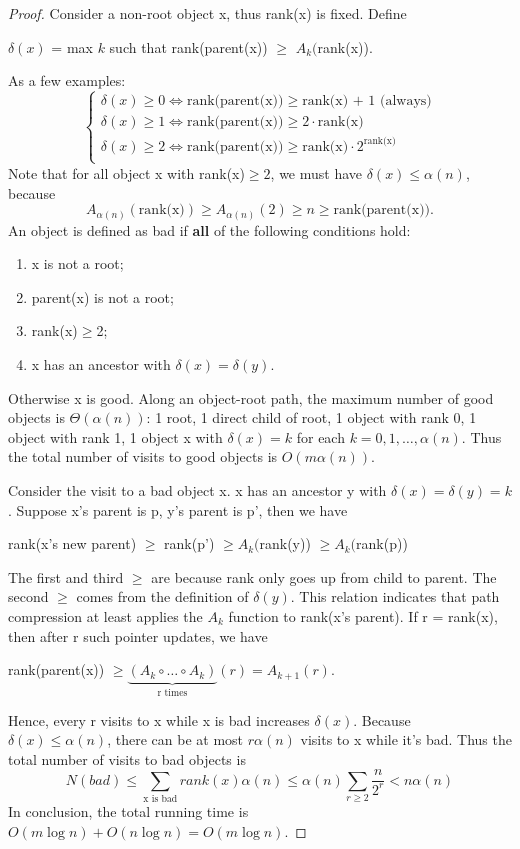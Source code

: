 \begin{proof}
Consider a non-root object x, thus rank(x) is fixed. Define 
\begin{center}
$\delta(x)$ = max $k$ such that rank(parent(x)) $\geq$ $A_k($rank(x)).
\end{center}
As a few examples:\\
\begin{equation*}
\begin{cases}
\delta(x)\geq 0\iff \text{rank(parent(x))} \geq \text{rank(x) + 1 (always)}\\
\delta(x)\geq 1\iff \text{rank(parent(x))} \geq 2\cdot\text{rank(x)}\\
\delta(x)\geq 2\iff \text{rank(parent(x))} \geq \text{rank(x)}\cdot 2^{\text{rank(x)}}\\
\end{cases}
\end{equation*}
Note that for all object x with rank(x)$\geq 2$, we must have $\delta(x)\leq\alpha(n)$, because 
$$A_{\alpha(n)}(\text{rank(x)})\geq A_{\alpha(n)}(2)\geq n\geq\text{rank(parent(x))}.$$ 
An object is defined as bad if \textbf{all} of the following conditions hold:
\begin{enumerate}
\item x is not a root;
\item parent(x) is not a root;
\item rank(x)$\geq$2;
\item x has an ancestor with $\delta(x)=\delta(y)$.
\end{enumerate}
Otherwise x is good. Along an object-root path, the maximum number of good objects is $\Theta(\alpha(n))$: 1 root, 1 direct child of root, 1 object with rank 0, 1 object with rank 1, 1 object x with $\delta(x)=k$ for each $k=0,1,\dots,\alpha(n)$. Thus the total number of visits to good objects is $O(m\alpha(n))$.

Consider the visit to a bad object x. x has an ancestor y with $\delta(x)=\delta(y)=k$. Suppose x's parent is p, y's parent is p', then we have 
\begin{center}
rank(x's new parent) $\geq$ rank(p') $\geq A_k($rank(y)) $\geq A_k($rank(p))
\end{center}
The first and third $\geq$ are because rank only goes up from child to parent. The second $\geq$ comes from the definition of $\delta(y)$. This relation indicates that path compression at least applies the $A_k$ function to rank(x's parent). If r = rank(x), then after r such pointer updates, we have 
\begin{center}
rank(parent(x)) $\geq\underbrace{(A_k\circ\dots\circ A_k)}_{\text{r times}}(r)=A_{k+1}(r).$ 
\end{center} 
Hence, every r visits to x while x is bad increases $\delta(x)$. Because $\delta(x)\leq\alpha(n)$, there can be at most $r\alpha(n)$ visits to x while it's bad. Thus the total number of visits to bad objects is 
\begin{equation*}
N(bad)\leq\sum\limits_{\text{x is bad}}rank(x)\alpha(n)\leq\alpha(n)\sum\limits_{r\geq 2}\frac{n}{2^r}<n\alpha(n)
\end{equation*}
In conclusion, the total running time is $O(m\log n)+O(n\log n)=O(m\log n)$.
\end{proof}
\ifx\PREAMBLE\undefined

\fi